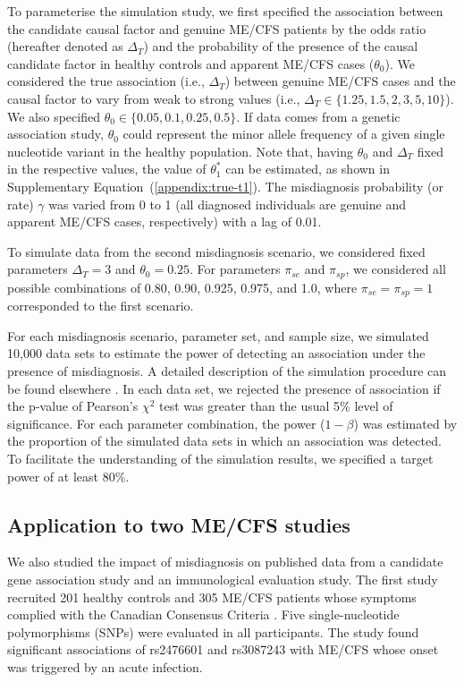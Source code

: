 To parameterise the simulation study, we first specified the association between the candidate causal factor and genuine ME/CFS patients by the odds ratio (hereafter denoted as $\Delta_T$) and the probability of the presence of the causal candidate factor in healthy controls and apparent ME/CFS cases ($\theta_0$). We considered the true association (i.e., $\Delta_T$) between genuine ME/CFS cases and the causal factor to vary from weak to strong values (i.e., $\Delta_T \in \{1.25,1.5,2,3,5,10\}$). We also specified $\theta_0 \in \{0.05,0.1,0.25,0.5\}$. If data comes from a genetic association study, $\theta_0$ could represent the minor allele frequency of a given single nucleotide variant in the healthy population. Note that, having $\theta_0$ and $\Delta_T$ fixed in the respective values, the value of $\theta_1^*$ can be estimated, as shown in Supplementary Equation~(\ref{appendix:true-t1}). The misdiagnosis probability (or rate) $\gamma$ was varied from 0 to 1 (all diagnosed individuals are genuine and apparent ME/CFS cases, respectively) with a lag of 0.01.

To simulate data from the second misdiagnosis scenario, we considered fixed parameters $\Delta_T = 3$ and $\theta_0 = 0.25$. For parameters $\pi_{se}$ and $\pi_{sp}$, we considered all possible combinations of 0.80, 0.90, 0.925, 0.975, and 1.0, where $\pi_{se} = \pi_{sp} = 1$ corresponded to the first scenario.

For each misdiagnosis scenario, parameter set, and sample size, we simulated 10,000 data sets to estimate the power of detecting an association under the presence of misdiagnosis. A detailed description of the simulation procedure can be found elsewhere \citep{malato2021Statisticalchallenges, malato2022ImpactMisclassification}. In each data set, we rejected the presence of association if the p-value of Pearson's $\chi^2$ test was greater than the usual 5\% level of significance. For each parameter combination, the power ($1 - \beta$) was estimated by the proportion of the simulated data sets in which an association was detected. To facilitate the understanding of the simulation results, we specified a target power of at least 80\%.

\subsection{Application to two ME/CFS studies}

We also studied the impact of misdiagnosis on published data from a candidate gene association study and an immunological evaluation study. The first study recruited 201 healthy controls and 305 ME/CFS patients whose symptoms complied with the Canadian Consensus Criteria \citep{steiner2020AutoimmunityRelatedRisk}. Five single-nucleotide polymorphisms (SNPs) were evaluated in all participants. The study found significant associations of rs2476601 and rs3087243 with ME/CFS whose onset was triggered by an acute infection.

